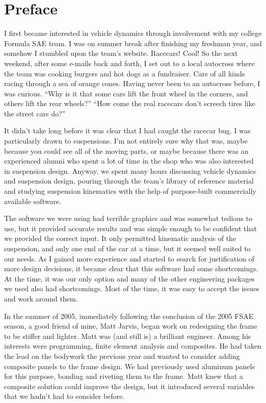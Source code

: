 \chapter{Preface}

I first became interested in vehicle dynamics through involvement with my college Formula SAE team.  I was on summer break after finishing my freshman year, and somehow I stumbled upon the team's website.  Racecars!  Cool!  So the next weekend, after some e-mails back and forth, I set out to a local autocross where the team was cooking burgers and hot dogs as a fundraiser.  Cars of all kinds racing through a sea of orange cones.  Having never been to an autocross before, I was curious.  ``Why is it that some cars lift the front wheel in the corners, and others lift the rear wheels?''  ``How come the real racecars don't screech tires like the street cars do?''

It didn't take long before it was clear that I had caught the racecar bug.  I was particularly drawn to suspensions.  I'm not entirely sure why that was, maybe because you could see all of the moving parts, or maybe because there was an experienced alumni who spent a lot of time in the shop who was also interested in suspension design.  Anyway, we spent many hours discussing vehicle dynamics and suspension design, pouring through the team's library of reference material and studying suspension kinematics with the help of purpose-built commercially available software.

The software we were using had terrible graphics and was somewhat tedious to use, but it provided accurate results and was simple enough to be confident that we provided the correct input.  It only permitted kinematic analysis of the suspension, and only one end of the car at a time, but it seemed well suited to our needs.  As I gained more experience and started to search for justification of more design decisions, it became clear that this software had some shortcomings.  At the time, it was our only option and many of the other engineering packages we used also had shortcomings.  Most of the time, it was easy to accept the issues and work around them.

In the summer of 2005, immediately following the conclusion of the 2005 FSAE season, a good friend of mine, Matt Jarvis, began work on redesigning the frame to be stiffer and lighter.  Matt was (and still is) a brilliant engineer.  Among his interests were programming, finite element analysis and composites.  He had taken the lead on the bodywork the previous year and wanted to consider adding composite panels to the frame design.  We had previously used aluminum panels for this purpose, bonding and riveting them to the frame.  Matt knew that a composite solution could improve the design, but it introduced several variables that we hadn't had to consider before.

